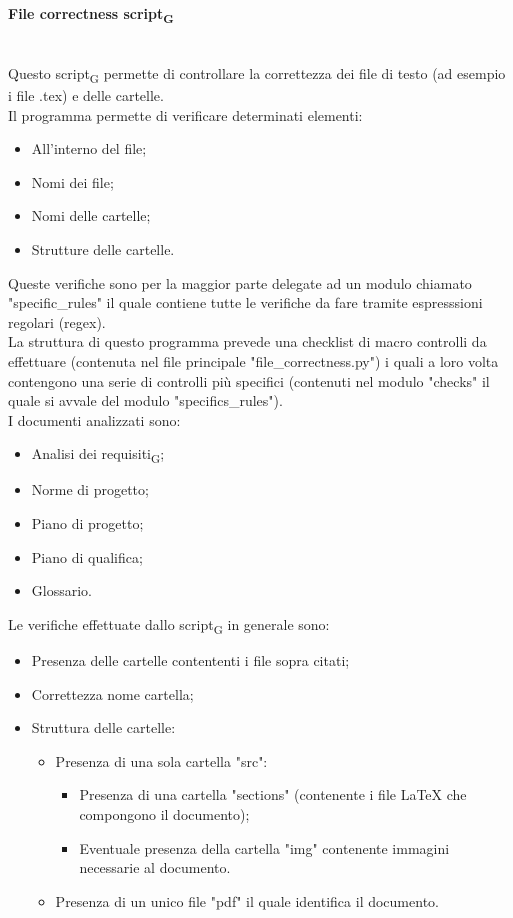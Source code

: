 \paragraph{File correctness script\textsubscript{G}}\mbox{}\\
Questo script\textsubscript{G} permette di controllare la correttezza dei file di testo (ad esempio i file .tex) e delle cartelle.\\
Il programma permette di verificare determinati elementi:
\begin{itemize}
	\item All'interno del file;
	\item Nomi dei file;
	\item Nomi delle cartelle;
	\item Strutture delle cartelle.
\end{itemize}
\noindent Queste verifiche sono per la maggior parte delegate ad un modulo chiamato "specific\_rules" il quale contiene tutte le verifiche da fare tramite espresssioni regolari (regex). \\
La struttura di questo programma prevede una checklist di macro controlli da effettuare (contenuta nel file principale "file\_correctness.py") i quali a loro volta contengono una serie di controlli più specifici (contenuti nel modulo "checks" il quale si avvale del modulo "specifics\_rules"). \\
I documenti analizzati sono:
\begin{itemize}
	\item Analisi dei requisiti\textsubscript{G};
	\item Norme di progetto;
	\item Piano di progetto;
	\item Piano di qualifica;
	\item Glossario.
\end{itemize}
\noindent Le verifiche effettuate dallo script\textsubscript{G} in generale sono:
\begin{itemize}
	\item Presenza delle cartelle contententi i file sopra citati;
	\item Correttezza nome cartella;
	\item Struttura delle cartelle:
		\begin{itemize}
			\item Presenza di una sola cartella "src":
				\begin{itemize}
					\item Presenza di una cartella "sections" (contenente i file LaTeX che compongono il documento);
					\item Eventuale presenza della cartella "img" contenente immagini necessarie al documento.
				\end{itemize}
			\item Presenza di un unico file "pdf" il quale identifica il documento.
		\end{itemize}
\end{itemize}
